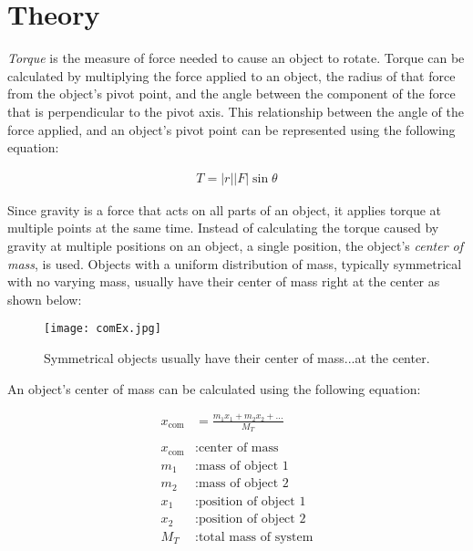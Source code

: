\section{Theory}
\vspace{-0.5cm}
\singlespacing

\textit{Torque} is the measure of force needed to cause an object to rotate. Torque can be calculated by multiplying the force applied to an object, the radius of that force from the object's pivot point, and the angle between the component of the force that is perpendicular to the pivot axis. This relationship between the angle of the force applied, and an object's pivot point can be represented using the following equation:

\begin{align*}
	T = \left| r \right | \left | F \right| \sin \theta 
\end{align*}

Since gravity is a force that acts on all parts of an object, it applies torque at multiple points at the same time. Instead of calculating the torque caused by gravity at multiple positions on an object, a single position, the object's \textit{center of mass}, is used. Objects with a uniform distribution of mass, typically symmetrical with no varying mass, usually have their center of mass right at the center as shown below:

\begin{figure}[H]
	\begin{center}
		\texttt{[image: comEx.jpg]}
	\end{center}
	\caption{Symmetrical objects usually have their center of mass...at the center.}\label{fig:comEx}
\end{figure}

An object's center of mass can be calculated using the following equation:

\begin{align*}
	x_\text{com} &= \frac{m_1x_1 + m_2x_2 + ...}{M_T} \\ \\
x_\text{com} &: \text{center of mass} \\
	m_1 &: \text{mass of object 1} \\
	m_2 &: \text{mass of object 2} \\
	x_1 &: \text{position of object 1} \\
	x_2 &: \text{position of object 2} \\
	M_T &: \text{total mass of system}
\end{align*}

\newpage
